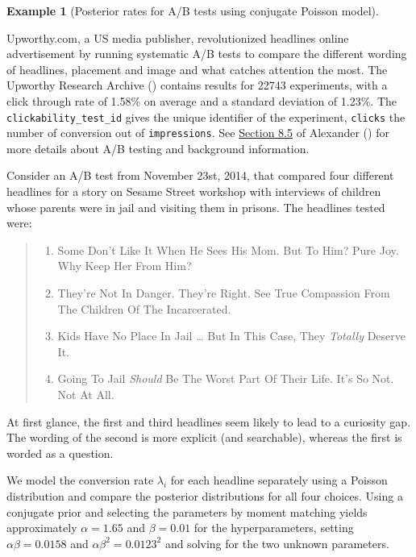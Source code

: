\documentclass[
  11pt,
  letterpaper,
]{scrbook}
\providecommand{\tightlist}{%
  \setlength{\itemsep}{0pt}\setlength{\parskip}{0pt}}\usepackage{longtable,booktabs,array}
\theoremstyle{definition}
\theoremstyle{definition}
\newtheorem{example}{Example}[chapter]
\theoremstyle{definition}
\theoremstyle{plain}
\theoremstyle{plain}
\theoremstyle{remark}
\begin{document}
\begin{example}[Posterior rates for A/B tests using conjugate Poisson
model]\protect\hypertarget{exm-abtest}{}\label{exm-abtest}

Upworthy.com, a US media publisher, revolutionized headlines online
advertisement by running systematic A/B tests to compare the different
wording of headlines, placement and image and what catches attention the
most. The Upworthy Research Archive () contains results for 22743 experiments, with a click
through rate of 1.58\% on average and a standard deviation of 1.23\%.
The \texttt{clickability\_test\_id} gives the unique identifier of the
experiment, \texttt{clicks} the number of conversion out of
\texttt{impressions}. See
\href{https://tellingstorieswithdata.com/08-hunt.html\#ab-testing}{Section
8.5} of Alexander () for more details
about A/B testing and background information.

Consider an A/B test from November 23st, 2014, that compared four
different headlines for a story on Sesame Street workshop with
interviews of children whose parents were in jail and visiting them in
prisons. The headlines tested were:

\begin{quote}
\begin{enumerate}
\def\labelenumi{\arabic{enumi}.}
\tightlist
\item
  Some Don't Like It When He Sees His Mom. But To Him? Pure Joy. Why
  Keep Her From Him?
\item
  They're Not In Danger. They're Right. See True Compassion From The
  Children Of The Incarcerated.
\item
  Kids Have No Place In Jail \ldots{} But In This Case, They
  \emph{Totally} Deserve It.
\item
  Going To Jail \emph{Should} Be The Worst Part Of Their Life. It's So
  Not. Not At All.
\end{enumerate}
\end{quote}

At first glance, the first and third headlines seem likely to lead to a
curiosity gap. The wording of the second is more explicit (and
searchable), whereas the first is worded as a question.

We model the conversion rate \(\lambda_i\) for each headline separately
using a Poisson distribution and compare the posterior distributions for
all four choices. Using a conjugate prior and selecting the parameters
by moment matching yields approximately \(\alpha = 1.65\) and
\(\beta = 0.01\) for the hyperparameters, setting
\(\alpha\beta = 0.0158\) and \(\alpha\beta^2=0.0123^2\) and solving for
the two unknown parameters.


\end{example}
\end{document}
